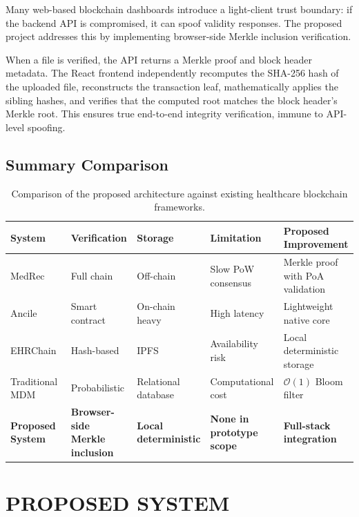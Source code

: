 \documentclass[12pt]{article}
\begin{document}
Many web-based blockchain dashboards introduce a light-client trust boundary: if the backend API is compromised, it can spoof validity responses. The proposed project addresses this by implementing browser-side Merkle inclusion verification.

When a file is verified, the API returns a Merkle proof and block header metadata. The React frontend independently recomputes the SHA-256 hash of the uploaded file, reconstructs the transaction leaf, mathematically applies the sibling hashes, and verifies that the computed root matches the block header's Merkle root. This ensures true end-to-end integrity verification, immune to API-level spoofing.

\subsection{Summary Comparison}

\begin{table}[htbp]
\centering
\small
\renewcommand{\arraystretch}{1.18}
\begin{tabularx}{\textwidth}{|Y|Y|Y|Y|Y|}
\hline
\textbf{System} & \textbf{Verification} & \textbf{Storage} & \textbf{Limitation} & \textbf{Proposed Improvement} \\ \hline
MedRec~\cite{18} & Full chain & Off-chain & Slow PoW consensus & Merkle proof with PoA validation \\ \hline
Ancile~\cite{22} & Smart contract & On-chain heavy & High latency & Lightweight native core \\ \hline
EHRChain~\cite{38} & Hash-based & IPFS & Availability risk & Local deterministic storage \\ \hline
Traditional MDM~\cite{55} & Probabilistic & Relational database & Computational cost & $\mathcal{O}(1)$ Bloom filter \\ \hline
\textbf{Proposed System} & \textbf{Browser-side Merkle inclusion} & \textbf{Local deterministic} & \textbf{None in prototype scope} & \textbf{Full-stack integration} \\ \hline
\end{tabularx}
\caption{Comparison of the proposed architecture against existing healthcare blockchain frameworks.}
\label{tab:comparison}
\end{table}

\newpage
\section{PROPOSED SYSTEM}
\end{document}

